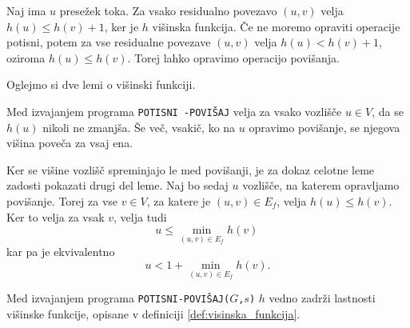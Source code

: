 \documentclass[mat1]{fmfdelo}
\begin{document}
\begin{dokaz}
Naj ima $u$ presežek toka. Za vsako residualno povezavo $(u,v)$ velja $h(u) \leq h(v) + 1$, ker je $h$ višinska funkcija. Če ne moremo opraviti operacije potisni, potem za vse residualne povezave $(u,v)$ velja $h(u) < h(v)+1$, oziroma $h(u) \leq h(v)$. Torej lahko opravimo operacijo povišanja.
\end{dokaz}

Oglejmo si dve lemi o višinski funkciji.

\begin{lema}\label{lem:visina_ne_pada}
Med izvajanjem programa \texttt{POTISNI -POVIŠAJ} velja za vsako vozlišče $u \in V$, da se $h(u)$ nikoli ne zmanjša. Še več, vsakič, ko na $u$ opravimo povišanje, se njegova višina poveča za vsaj ena.
\end{lema}

\begin{dokaz}
Ker se višine vozlišč spreminjajo le med povišanji, je za dokaz celotne leme zadosti pokazati drugi del leme. Naj bo sedaj $u$ vozlišče, na katerem opravljamo povišanje. Torej za vse $v \in V$, za katere je $(u,v) \in E_f$, velja $h(u) \leq h(v)$. Ker to velja za vsak $v$, velja tudi \[u \leq \min_{(u,v) \in E_f} h(v)\,\] kar pa je ekvivalentno \[u < 1 + \min_{(u,v) \in E_f} h(v).\]
\end{dokaz}

\begin{lema}
Med izvajanjem programa \texttt{POTISNI-POVIŠAJ($G$,$s$)} $h$ vedno zadrži lastnosti višinske funkcije, opisane v definiciji \ref{def:visinska_funkcija}.
\end{lema}
\end{document}
